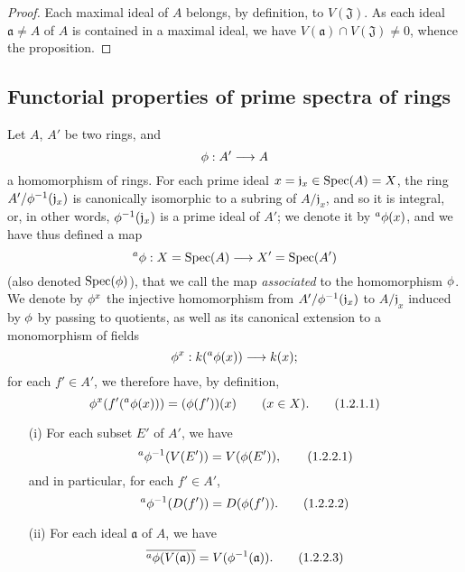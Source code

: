 \begin{proof}
\label{proof-1.1.1.15}
Each maximal ideal of $A$ belongs, by definition, to $V(\mathfrak{J})$.
As each ideal $\mathfrak{a}\neq A$ of $A$ is contained in a maximal ideal, we have $V(\mathfrak{a})\cap V(\mathfrak{J})\neq 0$, whence the proposition.
\end{proof}

\subsection{Functorial properties of prime spectra of rings}
\label{subsection:1.1.2}

\begin{env}[1.2.1]
\label{1.1.2.1}
Let $A$, $A'$ be two rings, and
\[
  \vphi:A'\to A
\]
a homomorphism of rings.
For each prime ideal $x=\mathfrak{j}_x\in\operatorname{Spec}(A)=X$, the ring $A'/\phi^{-1}(\mathfrak{j}_x)$ is canonically isomorphic to a subring of $A/\mathfrak{j}_x$, and so it is integral, or, in other words, $\phi^{-1}(\mathfrak{j}_x)$ is a prime ideal of $A'$;
we denote it by ${}^a\phi(x)$, and we have thus defined a map
\[
  {}^a\vphi:X=\Spec(A)\to X'=\Spec(A')
\]
(also denoted $\operatorname{Spec}(\phi)$), that we call the map \emph{associated} to the homomorphism $\phi$.
We denote by $\phi^x$ the injective homomorphism from $A'/\phi^{-1}(\mathfrak{j}_x)$ to $A/\mathfrak{j}_x$ induced by $\phi$ by passing to quotients, as well as its canonical extension to a monomorphism of fields
\[
  \vphi^x:\kres({}^a\vphi(x))\to\kres(x);
\]
\erratum[II]{}
for each $f'\in A'$, we therefore have, by definition,
\[
  \phi^x(f'({}^a\phi(x)))=(\phi(f'))(x)\qquad(x\in X).
  \tag{1.2.1.1}
\]
\end{env}

\begin{proposition}[1.2.2]
\label{1.1.2.2}
\medskip\noindent
\begin{enumerate}
  \item[{\rm(i)}] For each subset $E'$ of $A'$, we have
    \[
    \label{eq:1.1.2.2.1}
      {}^a\phi^{-1}(V(E'))=V(\phi(E')),
      \tag{1.2.2.1}
    \]
    and in particular, for each $f'\in A'$,
    \[
    \label{eq:1.1.2.2.2}
      {}^a\phi^{-1}(D(f'))=D(\phi(f')).
      \tag{1.2.2.2}
    \]
  \item[{\rm(ii)}] For each ideal $\mathfrak{a}$ of $A$, we have
    \[
    \label{eq:1.1.2.2.3}
      \overline{{}^a\phi(V(\mathfrak{a}))}=V(\phi^{-1}(\mathfrak{a})).
      \tag{1.2.2.3}
    \]
\end{enumerate}
\end{proposition}

